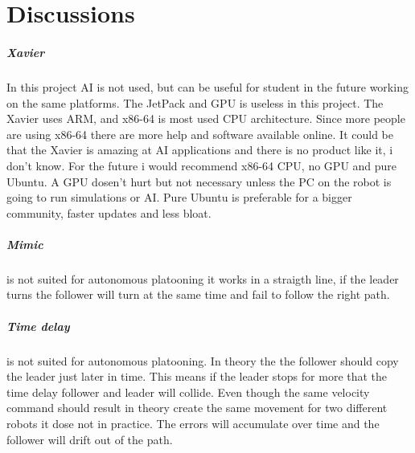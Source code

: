 \chapter{Discussions}

\paragraph{Xavier}
In this project AI is not used, but can be useful for student in the future working on the same platforms. The JetPack and GPU is useless in this project. The Xavier uses ARM, and x86-64 is most used CPU architecture. Since more people are using x86-64 there are more help and software available online. 
It could be that the Xavier is amazing at AI applications and there is no product like it, i don't know. For the future i would recommend x86-64 CPU, no GPU and pure Ubuntu. A GPU dosen't hurt but not necessary unless the PC on the robot is going to run simulations or AI. Pure Ubuntu is preferable for a bigger community, faster updates and less bloat. 

\paragraph{Mimic} is not suited for autonomous platooning it works in a straigth line, if the leader turns the follower will turn at the same time and fail to follow the right path. 

\paragraph{Time delay} is not suited for autonomous platooning. In theory the the follower should copy the leader just later in time. This means if the leader stops for more that the time delay follower and leader will collide. Even though the same velocity command should result in theory create the same movement for two different robots it dose not in practice. The errors will accumulate over time and the follower will drift out of the path. 


